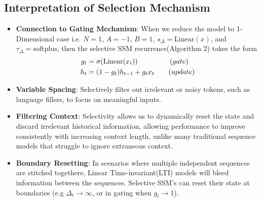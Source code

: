 \documentclass{article}
\theoremstyle{definition}
\begin{document}
\subsection{Interpretation of Selection Mechanism}
\label{appendix:selection-mechanism}
\begin{itemize}
    \item \textbf{Connection to Gating Mechanism}: When we reduce the model to 1-Dimensional case i.e.  $N = 1$, $A = -1$, $B = 1$, $s_\Delta = \text{Linear}(x)$, and $\tau_\Delta = \text{softplus}$, then the selective SSM recurrence(Algorithm 2) takes the form
    \begin{align}
        g_t &= \sigma(\text{Linear}(x_t)) \hspace{16mm} (gate)\nonumber \\
        h_t &= (1 - g_t) h_{t-1} + g_t x_t  \hspace{7mm}  (update) \nonumber
    \end{align}

    \item \textbf{Variable Spacing}: Selectively filter out irrelevant or noisy tokens, such as language fillers, to focus on meaningful inputs.
    \item \textbf{Filtering Context}: Selectivity allows us to  dynamically reset the state and discard irrelevant historical information, allowing performance to improve consistently with increasing context length, unlike many traditional sequence models that struggle to ignore extraneous context.
    \item \textbf{Boundary Resetting}: In scenarios where multiple independent sequences are stitched togethere, Linear Time-invariant(LTI) models will bleed information between the sequences. Selective SSM's can  reset their state at boundaries (e.g $\Delta_t \rightarrow \infty$, or in gating when $g_t \rightarrow 1$).
\end{itemize}
\end{document}
